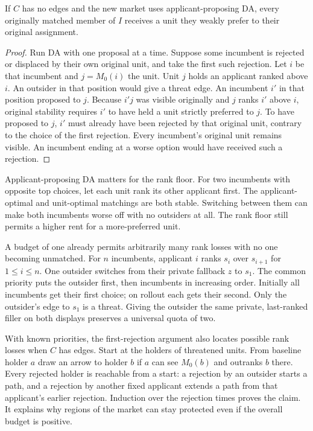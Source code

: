 \begin{corollary}\label{cor:guard-rank}
If $C$ has no edges and the new market uses applicant-proposing DA,
every originally matched member of $I$ receives a unit they weakly
prefer to their original assignment.
\end{corollary}
\begin{proof}
Run DA with one proposal at a time. Suppose some incumbent is rejected or
displaced by their own original unit, and take the first such rejection.
Let $i$ be that incumbent and $j=M_0(i)$ the unit. Unit $j$ holds an
applicant ranked above $i$. An outsider in that position would give a
threat edge. An incumbent $i'$ in that position proposed to $j$. Because
$i'j$ was visible originally and $j$ ranks $i'$ above $i$, original stability
requires $i'$ to have held a unit strictly preferred to $j$. To have proposed
to $j$, $i'$ must already have been rejected by that original unit, contrary
to the choice of the first rejection. Every incumbent's original unit remains
visible. An incumbent ending at a worse option would have received such a
rejection.
\end{proof}
Applicant-proposing DA matters for the rank floor. For two incumbents with
opposite top choices, let each unit rank its other applicant first. The
applicant-optimal and unit-optimal matchings are both stable. Switching
between them can make both incumbents worse off with no outsiders at all.
The rank floor still permits a higher rent for a more-preferred unit.

A budget of one already permits arbitrarily many rank losses with no one
becoming unmatched. For $n$ incumbents, applicant $i$ ranks $s_i$ over
$s_{i+1}$ for $1\le i\le n$. One outsider switches from their private
fallback $z$ to $s_1$. The common priority puts the outsider first, then
incumbents in increasing order. Initially all incumbents get their first
choice; on rollout each gets their second. Only the outsider's edge to $s_1$
is a threat. Giving the outsider the same private, last-ranked filler on both
displays preserves a universal quota of two.

With known priorities, the first-rejection argument also locates possible rank losses when $C$ has edges. Start at the holders of threatened units. From baseline holder $a$ draw an arrow to holder $b$ if $a$ can see $M_0(b)$ and outranks $b$ there. Every rejected holder is reachable from a start: a rejection by an outsider starts a path, and a rejection by another fixed applicant extends a path from that applicant's earlier rejection. Induction over the rejection times proves the claim. It explains why regions of the market can stay protected even if the overall budget is positive.

